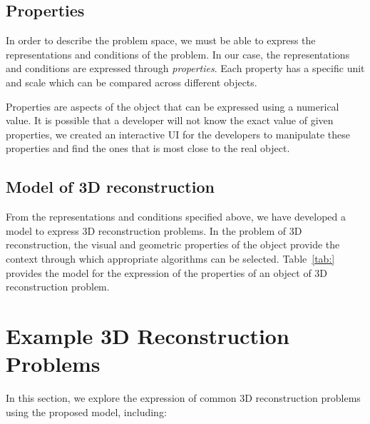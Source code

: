 \subsection{Properties}
In order to describe the problem space, we must be able to express the representations and conditions of the problem. In our case, the representations and conditions are expressed through \textit{properties}. Each property has a specific unit and scale which can be compared across different objects.

Properties are aspects of the object that can be expressed using a numerical value. It is possible that a developer will not know the exact value of given properties, we created an interactive UI for the developers to manipulate these properties and find the ones that is most close to the real object.

\subsection{Model of 3D reconstruction}
From the representations and conditions specified above, we have developed a model to express 3D reconstruction problems. In the problem of 3D reconstruction, the visual and geometric properties of the object provide the context through which appropriate algorithms can be selected. Table~\ref{tab:} provides the model for the expression of the properties of an object of 3D reconstruction problem.

\section{Example 3D Reconstruction Problems}
In this section, we explore the expression of common 3D reconstruction problems using the proposed model, including: 